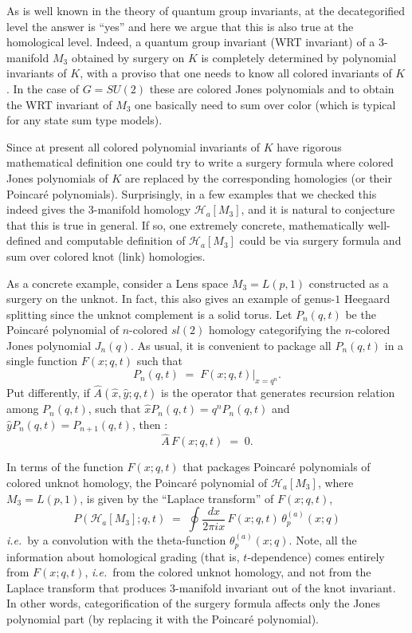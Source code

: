 \documentclass[hyper,letterpaper]{JHEP3}
\newcommand{\be}{\begin{equation}}
\newcommand{\ee}{\end{equation}}
\renewcommand{\hat}{\widehat}
\def\CH{{\mathcal H}}
\begin{document}
As is well known in the theory of quantum group invariants, at the decategorified level the answer is ``yes''
and here we argue that this is also true at the homological level. Indeed, a quantum group invariant (WRT invariant)
of a 3-manifold $M_3$ obtained by surgery on $K$ is completely determined by polynomial invariants of $K$,
with a proviso that one needs to know all colored invariants of $K$. In the case of $G=SU(2)$ these are colored
Jones polynomials and to obtain the WRT invariant of $M_3$ one basically need to sum over color (which is typical for any state sum type models).

Since at present all colored polynomial invariants of $K$ have rigorous mathematical definition one could try
to write a surgery formula where colored Jones polynomials of $K$ are replaced by the corresponding homologies
(or their Poincar\'e polynomials). Surprisingly, in a few examples that we checked this indeed gives
the 3-manifold homology $\CH_a[M_3]$, and it is natural to conjecture that this is true in general.
If so, one extremely concrete, mathematically well-defined and computable definition of $\CH_a[M_3]$
could be via surgery formula and sum over colored knot (link) homologies.

As a concrete example, consider a Lens space $M_3 = L(p,1)$ constructed as a surgery on the unknot.
In fact, this also gives an example of genus-$1$ Heegaard splitting since the unknot complement is a solid torus.
Let $P_n (q,t)$ be the Poincar\'e polynomial of $n$-colored $sl(2)$ homology categorifying the $n$-colored
Jones polynomial $J_n (q)$. As usual, it is convenient to package all $P_n (q,t)$ in a single function $F(x;q,t)$
such that
\be
P_n (q,t) \; = \; F(x;q,t) \vert_{x = q^n}.
\ee
Put differently, if $\hat A (\hat x, \hat y; q,t)$ is the operator that generates recursion relation among $P_n (q,t)$,
such that $\hat x P_n (q,t) = q^n P_n (q,t)$ and $\hat y P_n (q,t) = P_{n+1} (q,t)$, then \cite{Fuji:2012pm,Gukov:2015gmm}:
\be
\hat A \, F (x;q,t) \; = \; 0.
\ee

In terms of the function $F(x;q,t)$ that packages Poincar\'e polynomials of colored unknot homology,
the Poincar\'e polynomial of $\CH_a[M_3]$, where $M_3 = L(p,1)$,
is given by the ``Laplace transform'' \cite{Gukov:2016njj,BBLlaplace,MR2457479} of $F(x;q,t)$,
\be
P(\CH_a[M_3];q,t) \; = \; \oint \frac{dx}{2\pi i x} \, F(x;q,t) \, \theta_p^{(a)} (x;q)
\ee
{\it i.e.}~by a convolution with the theta-function $\theta_p^{(a)} (x;q)$.
Note, all the information about homological grading (that is, $t$-dependence) comes entirely from $F(x;q,t)$,
{\it i.e.}~from the colored unknot homology, and not from the Laplace transform that produces 3-manifold invariant
out of the knot invariant. In other words, categorification of the surgery formula affects only the Jones polynomial
part (by replacing it with the Poincar\'e polynomial).
\end{document}
